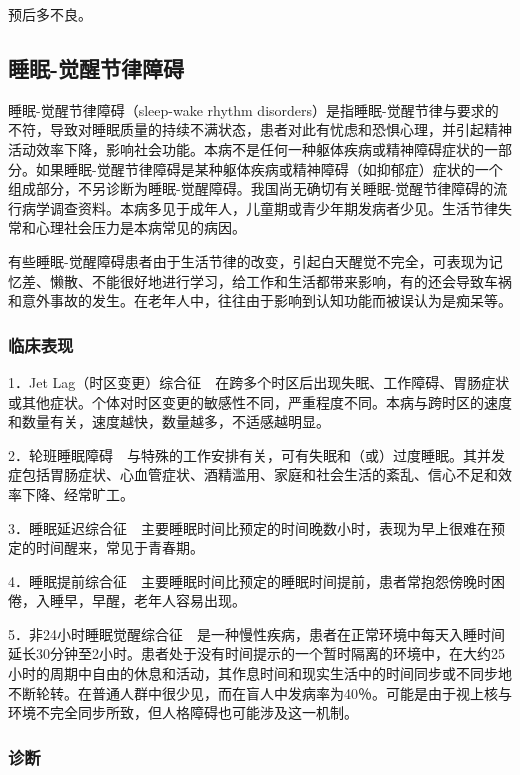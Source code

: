 预后多不良。

\subsection{睡眠-觉醒节律障碍}

睡眠-觉醒节律障碍（sleep-wake rhythm
disorders）是指睡眠-觉醒节律与要求的不符，导致对睡眠质量的持续不满状态，患者对此有忧虑和恐惧心理，并引起精神活动效率下降，影响社会功能。本病不是任何一种躯体疾病或精神障碍症状的一部分。如果睡眠-觉醒节律障碍是某种躯体疾病或精神障碍（如抑郁症）症状的一个组成部分，不另诊断为睡眠-觉醒障碍。我国尚无确切有关睡眠-觉醒节律障碍的流行病学调查资料。本病多见于成年人，儿童期或青少年期发病者少见。生活节律失常和心理社会压力是本病常见的病因。

有些睡眠-觉醒障碍患者由于生活节律的改变，引起白天醒觉不完全，可表现为记忆差、懒散、不能很好地进行学习，给工作和生活都带来影响，有的还会导致车祸和意外事故的发生。在老年人中，往往由于影响到认知功能而被误认为是痴呆等。

\subsubsection{临床表现}

1．Jet
Lag（时区变更）综合征　在跨多个时区后出现失眠、工作障碍、胃肠症状或其他症状。个体对时区变更的敏感性不同，严重程度不同。本病与跨时区的速度和数量有关，速度越快，数量越多，不适感越明显。

2．轮班睡眠障碍　与特殊的工作安排有关，可有失眠和（或）过度睡眠。其并发症包括胃肠症状、心血管症状、酒精滥用、家庭和社会生活的紊乱、信心不足和效率下降、经常旷工。

3．睡眠延迟综合征　主要睡眠时间比预定的时间晚数小时，表现为早上很难在预定的时间醒来，常见于青春期。

4．睡眠提前综合征　主要睡眠时间比预定的睡眠时间提前，患者常抱怨傍晚时困倦，入睡早，早醒，老年人容易出现。

5．非24小时睡眠觉醒综合征　是一种慢性疾病，患者在正常环境中每天入睡时间延长30分钟至2小时。患者处于没有时间提示的一个暂时隔离的环境中，在大约25小时的周期中自由的休息和活动，其作息时间和现实生活中的时间同步或不同步地不断轮转。在普通人群中很少见，而在盲人中发病率为40％。可能是由于视上核与环境不完全同步所致，但人格障碍也可能涉及这一机制。

\subsubsection{诊断}

